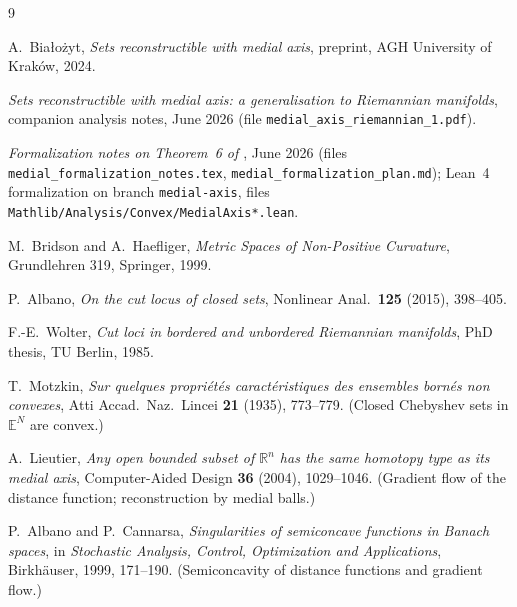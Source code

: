 \documentclass[11pt]{article}
\theoremstyle{remark}
\begin{document}
\begin{thebibliography}{9}

 A.~Bia\l{}o\.zyt, \emph{Sets reconstructible with medial
axis}, preprint, AGH University of Krak\'ow, 2024.

 \emph{Sets reconstructible with medial axis: a
generalisation to Riemannian manifolds}, companion analysis notes,
June 2026 (file \texttt{medial\_axis\_riemannian\_1.pdf}).

 \emph{Formalization notes on Theorem~6 of
\cite{Bia}}, June 2026 (files
\texttt{medial\_formalization\_notes.tex},
\texttt{medial\_formalization\_plan.md}); Lean~4 formalization on
branch \texttt{medial-axis}, files
\texttt{Mathlib/Analysis/Convex/MedialAxis*.lean}.

 M.~Bridson and A.~Haefliger, \emph{Metric Spaces of
Non-Positive Curvature}, Grundlehren 319, Springer, 1999.

 P.~Albano, \emph{On the cut locus of closed sets},
Nonlinear Anal.\ \textbf{125} (2015), 398--405.

 F.-E.~Wolter, \emph{Cut loci in bordered and unbordered
Riemannian manifolds}, PhD thesis, TU Berlin, 1985.

 T.~Motzkin, \emph{Sur quelques propri\'et\'es
caract\'eristiques des ensembles born\'es non convexes}, Atti Accad.\
Naz.\ Lincei \textbf{21} (1935), 773--779. (Closed Chebyshev sets in
$\mathbb{E}^{N}$ are convex.)

 A.~Lieutier, \emph{Any open bounded subset of
$\mathbb{R}^{n}$ has the same homotopy type as its medial axis},
Computer-Aided Design \textbf{36} (2004), 1029--1046. (Gradient flow
of the distance function; reconstruction by medial balls.)

 P.~Albano and P.~Cannarsa, \emph{Singularities of
semiconcave functions in Banach spaces}, in \emph{Stochastic Analysis,
Control, Optimization and Applications}, Birkh\"auser, 1999,
171--190. (Semiconcavity of distance functions and gradient flow.)

\end{thebibliography}
\end{document}
